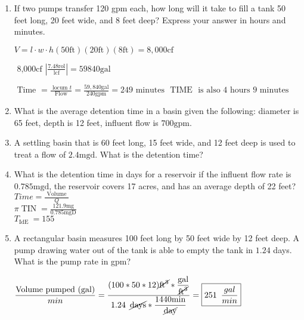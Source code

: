 \documentclass{article}
\begin{document}
\begin{enumerate}
  \item If two pumps transfer 120 gpm each, how long will it take to fill a tank 50 feet long, 20 feet wide, and 8 feet deep? Express your answer in hours and minutes.

$V=l \cdot w \cdot h (50 \mathrm{ft})(20 \mathrm{ft})(8 \mathrm{ft}) =8,000 \mathrm{cf} $\\
\vspace{0.3cm}

$\text { 8,000cf }\left|\frac{7.48 \mathrm{rol}}{\mathrm{lcf}}\right|=59840 \mathrm{gal} $\\
\vspace{0.3cm}

$\text { Time }=\frac{\text { locum } t}{\text { Flow }} =\frac{59,840 \mathrm{gal}}{240 \mathrm{gpm}} = 249 \text { minutes } \text { TIME } \text { is also } 4 \text { hours } 9 \text { minutes }$





  \item What is the average detention time in a basin given the following: diameter is 65 feet, depth is 12 feet, influent flow is $700 \mathrm{gpm}$.

  \item A settling basin that is 60 feet long, 15 feet wide, and 12 feet deep is used to treat a flow of $2.4 \mathrm{mgd}$. What is the detention time?

  \item What is the detention time in days for a reservoir if the influent flow rate is $0.785 \mathrm{mgd}$, the reservoir covers 17 acres, and has an average depth of 22 feet?\\
  $Time =\frac{\text { Volume }}{Q}$\\
  \vspace{0.3cm}
$\pi \operatorname{TIN}=\frac{121.9 \mathrm{mg}}{0.785 \mathrm{mgD}}$\\
$T_{\text {IdE }}=155$


  


  \item A rectangular basin measures 100 feet long by 50 feet wide by 12 feet deep. A pump drawing water out of the tank is able to empty the tank in $1.24$ days. What is the pump rate in gpm?


$ \dfrac{\textrm{Volume pumped (gal)}}{min}=\dfrac{(100*50*12)\cancel{\textrm{ft}^3}*\dfrac{\textrm{gal}}{\cancel{\textrm{ft}^3}}}{1.24\enspace \cancel{\textrm{days}}*\dfrac{1440 \textrm{min}}{\cancel{\textrm{day}}}}=\boxed{251 \enspace \dfrac{gal}{min}}$ \\ 


\end{enumerate}
\end{document}
